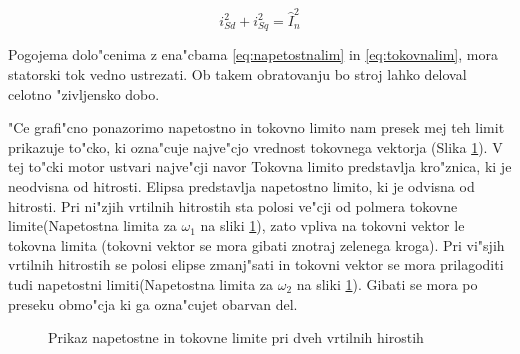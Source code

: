 \documentclass[journal,a4paper,twoside]{sty/IEEEtran}
\begin{document}
\begin{equation}
i_{Sd}^2+i_{Sq}^2=\hat{I}_{n}^2
\label{eq:tokovnalim}
\end{equation}

Pogojema dolo"cenima z ena"cbama \ref{eq:napetostnalim} in \ref{eq:tokovnalim}, mora statorski tok vedno ustrezati. Ob takem obratovanju bo stroj lahko deloval celotno "zivljensko dobo.



"Ce grafi"cno ponazorimo napetostno in tokovno limito nam presek mej teh limit prikazuje to"cko, ki ozna"cuje najve"cjo vrednost tokovnega vektorja (Slika \ref{fig:napetostna_tokovna_limita_slika}). V tej to"cki motor ustvari najve"cji navor Tokovna limito predstavlja kro"znica, ki je neodvisna od hitrosti. Elipsa predstavlja napetostno limito, ki je odvisna od hitrosti. Pri ni"zjih vrtilnih hitrostih sta polosi ve"cji od polmera tokovne limite(Napetostna limita za $\omega_1$ na sliki \ref{fig:napetostna_tokovna_limita_slika}), zato vpliva na tokovni vektor le tokovna limita (tokovni vektor se mora gibati znotraj zelenega kroga). Pri vi"sjih vrtilnih hitrostih se polosi elipse zmanj"sati in tokovni vektor se mora prilagoditi tudi napetostni limiti(Napetostna limita za $\omega_2$ na sliki \ref{fig:napetostna_tokovna_limita_slika}). Gibati se mora po preseku obmo"cja ki ga ozna"cujet obarvan del.

\begin{figure}
\caption{Prikaz napetostne in tokovne limite pri dveh vrtilnih hirostih}
\label{fig:napetostna_tokovna_limita_slika}

\end{figure}
\end{document}
